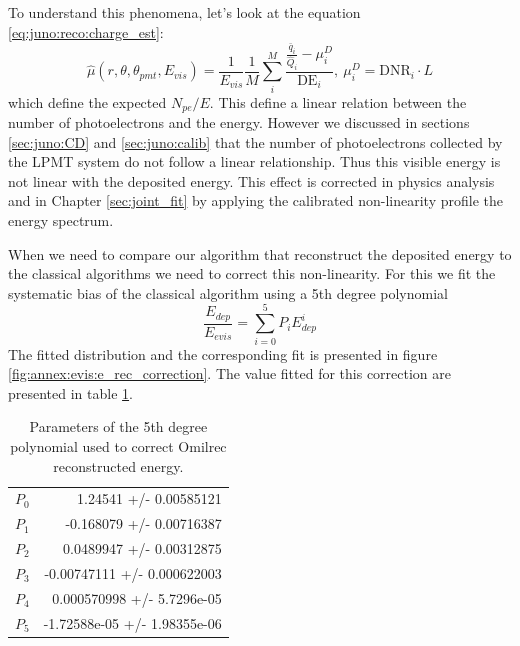 \documentclass[../main.tex]{subfiles}
\begin{document}
To understand this phenomena, let's look at the equation \ref{eq:juno:reco:charge_est}:
\begin{equation*}
  \hat{\mu}(r, \theta, \theta_{pmt}, E_{vis}) = \frac{1}{E_{vis}} \frac{1}{M} \sum_i^M\frac{\frac{\bar{q}_i}{\hat{Q}_i} - \mu_i^D}{\mathrm{DE}_i}, ~ \mu_i^D = \mathrm{DNR}_i \cdot L
\end{equation*}
which define the expected $N_{pe}/E$. This define a linear relation between the number of photoelectrons and the energy. However we discussed in sections \ref{sec:juno:CD} and \ref{sec:juno:calib} that the number of photoelectrons collected by the LPMT system do not follow a linear relationship. Thus this visible energy is not linear with the deposited energy. This effect is corrected in physics analysis and in Chapter \ref{sec:joint_fit} by applying the calibrated non-linearity profile the energy spectrum.

When we need to compare our algorithm that reconstruct the deposited energy to the classical algorithms we need to correct this non-linearity. For this we fit the systematic bias of the classical algorithm using a 5th degree polynomial
\begin{equation}
  \frac{E_{dep}}{E_{evis}} = \sum_{i=0}^5 P_i E_{dep}^i
\end{equation}
The fitted distribution and the corresponding fit is presented in figure \ref{fig:annex:evis:e_rec_correction}. The value fitted for this correction are presented in table \ref{tab:annex:evis:omil_params}.

\begin{table}[ht]
  \centering
  \begin{tabular}{|l|r|}
    $P_0$                        &      1.24541   +/-   0.00585121  \\
    $P_1$                        &    -0.168079   +/-   0.00716387  \\
    $P_2$                        &    0.0489947   +/-   0.00312875  \\
    $P_3$                        &  -0.00747111   +/-   0.000622003 \\
    $P_4$                        &  0.000570998   +/-   5.7296e-05  \\
    $P_5$                        & -1.72588e-05   +/-   1.98355e-06 \\
  \end{tabular}
  \caption{Parameters of the 5th degree polynomial used to correct Omilrec reconstructed energy.}
  \label{tab:annex:evis:omil_params}
\end{table}
\end{document}
